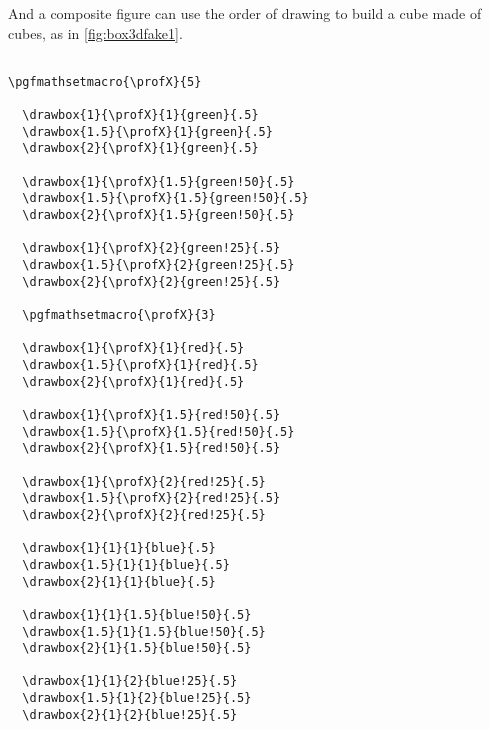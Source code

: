 And a composite figure can use the order of drawing to build a cube made of cubes, as in \autoref{fig:box3dfake1}.

\begin{lstlisting}[style=myLaTeX,caption=A cube made of cubes]

\pgfmathsetmacro{\profX}{5}

  \drawbox{1}{\profX}{1}{green}{.5}
  \drawbox{1.5}{\profX}{1}{green}{.5}
  \drawbox{2}{\profX}{1}{green}{.5}
  
  \drawbox{1}{\profX}{1.5}{green!50}{.5}
  \drawbox{1.5}{\profX}{1.5}{green!50}{.5}
  \drawbox{2}{\profX}{1.5}{green!50}{.5}
  
  \drawbox{1}{\profX}{2}{green!25}{.5}
  \drawbox{1.5}{\profX}{2}{green!25}{.5}
  \drawbox{2}{\profX}{2}{green!25}{.5}
  
  \pgfmathsetmacro{\profX}{3}
  
  \drawbox{1}{\profX}{1}{red}{.5}
  \drawbox{1.5}{\profX}{1}{red}{.5}
  \drawbox{2}{\profX}{1}{red}{.5}
  
  \drawbox{1}{\profX}{1.5}{red!50}{.5}
  \drawbox{1.5}{\profX}{1.5}{red!50}{.5}
  \drawbox{2}{\profX}{1.5}{red!50}{.5}
  
  \drawbox{1}{\profX}{2}{red!25}{.5}
  \drawbox{1.5}{\profX}{2}{red!25}{.5}
  \drawbox{2}{\profX}{2}{red!25}{.5}

  \drawbox{1}{1}{1}{blue}{.5}
  \drawbox{1.5}{1}{1}{blue}{.5}
  \drawbox{2}{1}{1}{blue}{.5}
 
  \drawbox{1}{1}{1.5}{blue!50}{.5}
  \drawbox{1.5}{1}{1.5}{blue!50}{.5}
  \drawbox{2}{1}{1.5}{blue!50}{.5}
  
  \drawbox{1}{1}{2}{blue!25}{.5}
  \drawbox{1.5}{1}{2}{blue!25}{.5}
  \drawbox{2}{1}{2}{blue!25}{.5}
     
\end{lstlisting}

